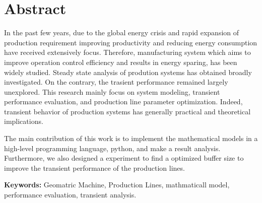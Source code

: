 \chapter*{Abstract}
\setlength{\parindent}{2pc}
\noindent In the past few years, due to the global energy crisis and rapid expansion of production requirement improving productivity and reducing energy consumption have received extensively focus. Therefore, manufacturing system which aims to improve operation control efficiency and results in energy sparing, has been widely studied. Steady state analysis of prodution systems has obtained broadly investigated. On the contrary, the trasient performance remained largely unexplored. This research mainly focus on system modeling, transient performance evaluation, and production line parameter optimization. Indeed, transient behavior of production systems has generally practical and theoretical implications. 

The main contribution of this work is to implement the mathematical models in a high-level programming language, python, and make a result analysis. Furthermore, we also designed a experiment to find a optimized buffer size to improve the transient performance of the production lines.


\vskip 0.75cm
\noindent\textbf{Keywords:} Geomatric Machine, Production Lines, mathmaticall model, performance evaluation, transient analysis.